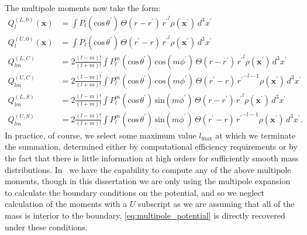 \documentclass[12pt]{article}
\begin{document}
The multipole moments now take the form:
\begin{align}
  Q_l^{(L,0)}(\mathbf{x}) &= \int P_l(\text{cos}\, \theta^\prime)\, \Theta(r - r^\prime)\, {r^{\prime}}^l \rho(\mathbf{x}^\prime)\, d^3 x^\prime \\
  Q_l^{(U,0)}(\mathbf{x}) &= \int P_l(\text{cos}\, \theta^\prime)\, \Theta(r^\prime - r)\, {r^{\prime}}^l \rho(\mathbf{x}^\prime)\, d^3 x^\prime \\  
  Q_{lm}^{(L,C)} &= 2\frac{(l-m)!}{(l+m)!} \int P_{l}^{m}(\text{cos}\, \theta^\prime)\, \text{cos}(m\phi^\prime)\, \Theta(r - r^\prime)\, {r^\prime}^l \rho(\mathbf{x}^\prime)\, d^3 x^\prime \\
  Q_{lm}^{(U,C)} &= 2\frac{(l-m)!}{(l+m)!} \int P_{l}^{m}(\text{cos}\, \theta^\prime)\, \text{cos}(m\phi^\prime)\, \Theta(r^\prime - r)\, {r^\prime}^{-l-1} \rho(\mathbf{x}^\prime)\, d^3 x^\prime \\
  Q_{lm}^{(L,S)} &= 2\frac{(l-m)!}{(l+m)!} \int P_{l}^{m}(\text{cos}\, \theta^\prime)\, \text{sin}(m\phi^\prime)\, \Theta(r - r^\prime)\, {r^\prime}^l \rho(\mathbf{x}^\prime)\, d^3 x^\prime \\
  Q_{lm}^{(U,S)} &= 2\frac{(l-m)!}{(l+m)!} \int P_{l}^{m}(\text{cos}\, \theta^\prime)\, \text{sin}(m\phi^\prime)\, \Theta(r^\prime - r)\, {r^\prime}^{-l-1} \rho(\mathbf{x}^\prime)\, d^3 x^\prime.  
\end{align}
In practice, of course, we select some maximum value $l_{\text{max}}$ at which we terminate the summation, determined either by computational efficiency requirements or by the fact that there is little information at high orders for sufficiently smooth mass distributions. In \castro\ we have the capability to compute any of the above multipole moments, though in this dissertation we are only using the multipole expansion to calculate the boundary conditions on the potential, and so we neglect calculation of the moments with a $U$ subscript as we are assuming that all of the mass is interior to the boundary. \autoref{eq:multipole_potential} is directly recovered under these conditions.

\clearpage
\end{document}
